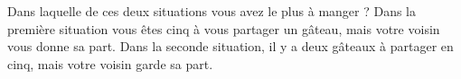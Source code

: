 
\begin{exercice}\label{exosmath-0872}

Dans laquelle de ces deux situations vous avez le plus à manger ? Dans la première situation vous êtes cinq à vous partager un gâteau, mais votre voisin vous donne sa part. Dans la seconde situation, il y a deux gâteaux à partager en cinq, mais votre voisin garde sa part.

\end{exercice}
